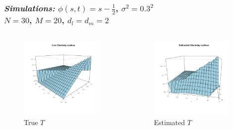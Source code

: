 \documentclass[12pt]{beamer}
\begin{document}
\begin{frame}
\frametitle{\emph{Simulations: }$\phi\left(s,t\right) = s-\frac{1}{2}$, $\sigma^2 = 0.3^2$\\
$N = 30$, $M=20$, $d_l = d_m= 2$}

 \begin{columns}
\begin{column}{0.5\textwidth}
    \begin{center}
    \begin{figure}
    \graphicspath{{img/}}
 \includegraphics[width=4cm]{linear-vc-model-true-cholesky}
 \caption{True $T$ }
 \end{figure}
     \end{center}
  \end{column}
\begin{column}{0.5\textwidth}  %
    \begin{center}
    \begin{figure}
    \graphicspath{{img/}}
 \includegraphics[width=4cm]{linear-vc-model-estimated-cholesky}
 \caption{Estimated $T$}
 \end{figure}
     \end{center}
\end{column}
\end{columns}


\end{frame}
\end{document}
